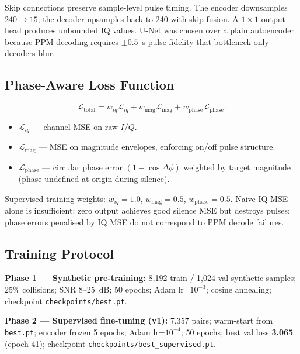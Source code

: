 \documentclass[11pt,a4paper]{article}
\begin{document}
Skip connections preserve sample-level pulse timing. The encoder downsamples
$240 \to 15$; the decoder upsamples back to 240 with skip fusion. A $1\times 1$
output head produces unbounded IQ values. U-Net was chosen over a plain
autoencoder because PPM decoding requires $\pm 0.5$~\textmu s pulse fidelity
that bottleneck-only decoders blur.

\subsection{Phase-Aware Loss Function}

\begin{equation}
  \mathcal{L}_{\mathrm{total}} =
  w_{iq}\mathcal{L}_{iq} +
  w_{\mathrm{mag}}\mathcal{L}_{\mathrm{mag}} +
  w_{\mathrm{phase}}\mathcal{L}_{\mathrm{phase}}.
  \label{eq:loss}
\end{equation}

\begin{itemize}[leftmargin=*]
  \item $\mathcal{L}_{iq}$ --- channel MSE on raw $I/Q$.
  \item $\mathcal{L}_{\mathrm{mag}}$ --- MSE on magnitude envelopes, enforcing
        on/off pulse structure.
  \item $\mathcal{L}_{\mathrm{phase}}$ --- circular phase error
        $(1 - \cos\Delta\phi)$ weighted by target magnitude (phase undefined at
        origin during silence).
\end{itemize}

Supervised training weights: $w_{iq}=1.0$, $w_{\mathrm{mag}}=0.5$,
$w_{\mathrm{phase}}=0.5$. Naive IQ MSE alone is insufficient: zero output
achieves good silence MSE but destroys pulses; phase errors penalised by IQ MSE
do not correspond to PPM decode failures.

\subsection{Training Protocol}

\textbf{Phase 1 --- Synthetic pre-training:}
8{,}192 train / 1{,}024 val synthetic samples; 25\% collisions; SNR 8--25~dB;
50 epochs; Adam lr=$10^{-3}$; cosine annealing; checkpoint
\texttt{checkpoints/best.pt}.

\textbf{Phase 2 --- Supervised fine-tuning (v1):}
7{,}357 pairs; warm-start from \texttt{best.pt}; encoder frozen 5 epochs; Adam
lr=$10^{-4}$; 50 epochs; best val loss \textbf{3.065} (epoch 41); checkpoint
\texttt{checkpoints/best\_supervised.pt}.
\end{document}
